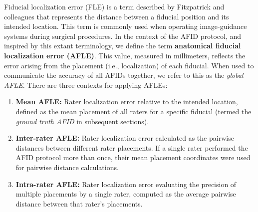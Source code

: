 \newpage
Fiducial localization error (FLE) is a term described by Fitzpatrick and colleagues\cite{Fitzpatrick1998-hp} that represents the distance between a fiducial position and its intended location. This term is commonly used when operating image-guidance systems during surgical procedures. In the context of the AFID protocol, and inspired by this extant terminology, we define the term \textbf{anatomical fiducial localization error (AFLE)}. This value, measured in millimeters, reflects the error arising from the placement (i.e., localization) of each fiducial. When used to communicate the accuracy of all AFIDs together, we refer to this as the \emph{global AFLE}. There are three contexts for applying AFLEs:
\begin{enumerate}
    \item \textbf{Mean AFLE:} Rater localization error relative to the intended location, defined as the mean placement of all raters for a specific fiducial (termed the \emph{ground truth AFID} in subsequent sections).
    \item \textbf{Inter-rater AFLE:} Rater localization error calculated as the pairwise distances between different rater placements. If a single rater performed the AFID protocol more than once, their mean placement coordinates were used for pairwise distance calculations.
    \item \textbf{Intra-rater AFLE:} Rater localization error evaluating the precision of multiple placements by a single rater, computed as the average pairwise distance between that rater’s placements.
\end{enumerate}

